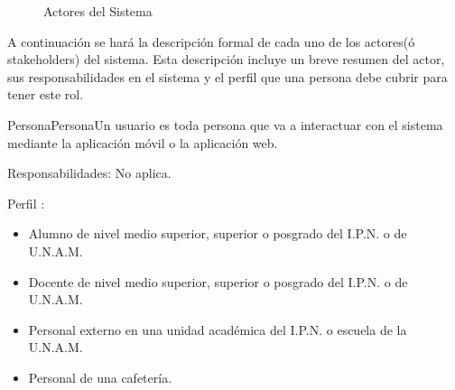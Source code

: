 \begin{figure}[hbtp!]
	\begin{center}
		\caption{Actores del Sistema}
		\label{fig:actores}
	\end{center}
\end{figure}

A continuación se hará la descripción formal de cada uno de los actores(ó stakeholders) del sistema. Esta descripción incluye un breve resumen del actor, sus responsabilidades en el sistema y el perfil que una persona debe cubrir para tener este rol.


\begin{Actor}{Persona}{Persona}{Un usuario es toda persona que va a interactuar con el sistema mediante la aplicación móvil o la aplicación web.}
	\item[Responsabilidades:] No aplica.
	\item[Perfil]:\hspace{1pt}
		\begin{itemize}
			\item Alumno de nivel medio superior, superior o posgrado del I.P.N. o de U.N.A.M.
			\item Docente de nivel medio superior, superior o posgrado del I.P.N. o de U.N.A.M.
			\item Personal externo en una unidad académica del I.P.N. o escuela de la U.N.A.M.
			\item Personal de una cafetería.
		\end{itemize}
\end{Actor}

